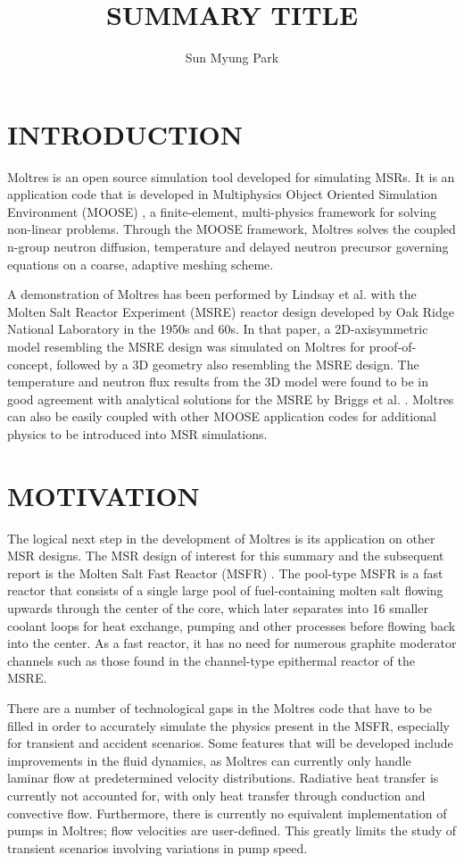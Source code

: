 \documentclass{anstrans}
\title{SUMMARY TITLE}
\author{Sun Myung Park}
\institute{Dept. of Nuclear, Plasma and Radiological Engineering, University of Illinois at Urbana-Champaign \\
smpark3@illinois.edu}
\begin{document}
\section{INTRODUCTION}

Moltres is an open source simulation tool developed for simulating MSRs. It is an application code that is developed in Multiphysics Object Oriented Simulation Environment (MOOSE) \cite{gaston_moose:_2009}, a finite-element, multi-physics framework for solving non-linear problems. Through the MOOSE framework, Moltres solves the coupled n-group neutron diffusion, temperature and delayed neutron precursor governing equations on a coarse, adaptive meshing scheme. 

A demonstration of Moltres has been performed by Lindsay et al. \cite{lindsay_introduction_2018} with the Molten Salt Reactor Experiment (MSRE) reactor design developed by Oak Ridge National Laboratory in the 1950s and 60s. In that paper, a 2D-axisymmetric model resembling the MSRE design was simulated on Moltres for proof-of-concept, followed by a 3D geometry also resembling the MSRE design. The temperature and neutron flux results from the 3D model were found to be in good agreement with analytical solutions for the MSRE by Briggs et al. \cite{briggs_molten-salt_1964}. Moltres can also be easily coupled with other MOOSE application codes for additional physics to be introduced into MSR simulations.

\section{MOTIVATION}

The logical next step in the development of Moltres is its application on other MSR designs. The MSR design of interest for this summary and the subsequent report is the Molten Salt Fast Reactor (MSFR) \cite{serp_molten_2014}. The pool-type MSFR is a fast reactor that consists of a single large pool of fuel-containing molten salt flowing upwards through the center of the core, which later separates into 16 smaller coolant loops for heat exchange, pumping and other processes before flowing back into the center. As a fast reactor, it has no need for numerous graphite moderator channels such as those found in the channel-type epithermal reactor of the MSRE.

There are a number of technological gaps in the Moltres code that have to be filled in order to accurately simulate the physics present in the MSFR, especially for transient and accident scenarios. Some features that will be developed include improvements in the fluid dynamics, as Moltres can currently only handle laminar flow at predetermined velocity distributions. Radiative heat transfer is currently not accounted for, with only heat transfer through conduction and convective flow. Furthermore, there is currently no equivalent implementation of pumps in Moltres; flow velocities are user-defined. This greatly limits the study of transient scenarios involving variations in pump speed.
\end{document}
